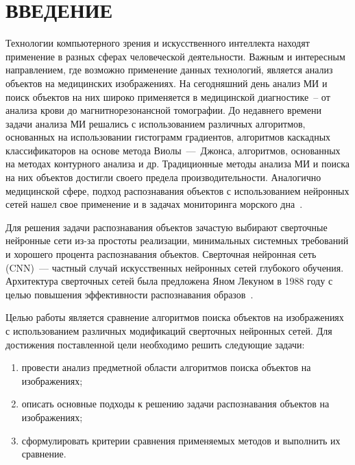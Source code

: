 \chapter*{ВВЕДЕНИЕ}

Технологии компьютерного зрения и искусственного интеллекта находят применение в разных сферах человеческой деятельности.
Важным и интересным направлением, где возможно применение данных технологий, является анализ объектов на медицинских изображениях.
На сегодняшний день анализ МИ и поиск объектов на них широко применяется в медицинской диагностике~-- от анализа крови до магнитнорезонансной томографии.
До недавнего времени задачи анализа МИ решались с использованием различных алгоритмов, основанных на использовании гистограмм градиентов, алгоритмов каскадных классификаторов на основе метода Виолы~---~Джонса, алгоритмов, основанных на методах контурного анализа и др.
Традиционные методы анализа МИ и поиска на них объектов достигли своего предела производительности.
Аналогично медицинской сфере, подход распознавания объектов с использованием нейронных сетей нашел свое применение и в задачах мониторинга морского дна~\cite{intro1, intro2}.

Для решения задачи распознавания объектов зачастую выбирают сверточные нейронные сети из-за простоты реализации, минимальных системных требований и хорошего процента распознавания объектов. 
Сверточная нейронная сеть (CNN)~--- частный случай искусственных нейронных сетей глубокого обучения.
Архитектура сверточных сетей была предложена Яном Лекуном в 1988 году с целью повышения эффективности распознавания образов~\cite{cnn, cnndef}.

Целью работы является сравнение алгоритмов поиска объектов на изображениях с использованием различных модификаций сверточных нейронных сетей.
Для достижения поставленной цели необходимо решить следующие задачи:
\begin{enumerate}
    \item провести анализ предметной области алгоритмов поиска объектов на изображениях;
    \item описать основные подходы к решению задачи распознавания объектов на изображениях;
    \item сформулировать критерии сравнения применяемых методов и выполнить их сравнение.
\end{enumerate}